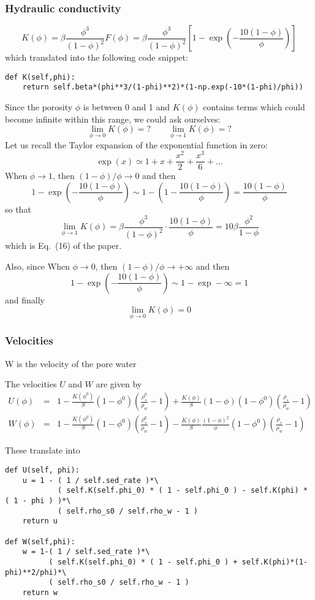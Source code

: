 \documentclass[a4paper]{article}
\begin{document}
\subsubsection*{Hydraulic conductivity}

\[
K(\phi)
=\beta \frac{\phi^3}{(1-\phi)^2} F(\phi)
=\beta \frac{\phi^3}{(1-\phi)^2} \left[ 1-\exp\left( -\frac{10(1-\phi)}{\phi} \right) \right] 
\]
which translated into the following code snippet:
\begin{lstlisting}
def K(self,phi):
    return self.beta*(phi**3/(1-phi)**2)*(1-np.exp(-10*(1-phi)/phi))
\end{lstlisting}

Since the porosity $\phi$ is between 0 and 1 and $K(\phi)$ contains terms which 
could become infinite within this range, we could ask ourselves:
\[
\lim_{\phi\rightarrow 0} K(\phi) = ?
\qquad
\lim_{\phi\rightarrow 1} K(\phi) = ?
\]
Let us recall the Taylor expansion of the exponential function in zero:
\[
\exp (x) \simeq 1 + x + \frac{x^2}{2} + \frac{x^3}{6} + \dots
\]
When $\phi \rightarrow 1$, then $(1-\phi)/\phi \rightarrow 0$ and then 
\[
1-\exp\left( -\frac{10(1-\phi)}{\phi} \right) \sim 1- (1 -\frac{10(1-\phi)}{\phi} ) = \frac{10(1-\phi)}{\phi}
\]
so that 
\[
\lim_{\phi\rightarrow 1} K(\phi) = \beta \frac{\phi^3}{(1-\phi)^2} \cdot \frac{10(1-\phi)}{\phi}
=10 \beta \frac{\phi^2}{1-\phi}
\]
which is Eq.~(16) of the paper.

Also, since When $\phi \rightarrow 0$, then $(1-\phi)/\phi \rightarrow +\infty$ and then
\[
1-\exp\left( -\frac{10(1-\phi)}{\phi} \right) \sim 1 - \exp -\infty = 1 
\]
and finally
\[
\lim_{\phi\rightarrow 0} K(\phi) = 0
\]

\subsubsection*{Velocities}

W is the velocity of the pore water

The velocities $U$ and $W$ are given by 
\begin{eqnarray}
U(\phi)&=& 1-\frac{K(\phi^0)}{S}(1-\phi^0)(\frac{\rho_s^0}{\rho_w}-1) 
+\frac{K(\phi)}{S}(1-\phi) (1-\phi^0)(\frac{\rho_s}{\rho_w}-1)    \\
W(\phi)&=& 1-\frac{K(\phi^0)}{S}(1-\phi^0)(\frac{\rho_s^0}{\rho_w}-1) 
-\frac{K(\phi)}{S} \frac{(1-\phi)^2}{\phi} (1-\phi^0)(\frac{\rho_s}{\rho_w}-1)   
\end{eqnarray}

These translate into
\begin{lstlisting}
def U(self, phi):
    u = 1 - ( 1 / self.sed_rate )*\
            ( self.K(self.phi_0) * ( 1 - self.phi_0 ) - self.K(phi) * ( 1 - phi ) )*\
            ( self.rho_s0 / self.rho_w - 1 )
    return u

def W(self,phi):
    w = 1-( 1 / self.sed_rate )*\
          ( self.K(self.phi_0) * ( 1 - self.phi_0 ) + self.K(phi)*(1-phi)**2/phi)*\
          ( self.rho_s0 / self.rho_w - 1 )
    return w
\end{lstlisting}
\end{document}
